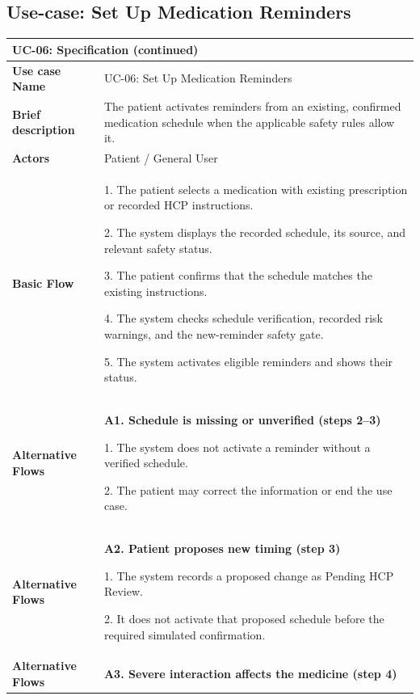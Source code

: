 
\clearpage
\subsection{Use-case: Set Up Medication Reminders}
\label{uc:uc-06}

\begin{longtable}{|p{}|p{}|}
\hline
\endfirsthead
\multicolumn{2}{l}{\textbf{UC-06: Specification (continued)}} \\
\hline
\endhead
\textbf{Use case Name} & UC-06: Set Up Medication Reminders \\ \hline
\textbf{Brief description} & The patient activates reminders from an existing, confirmed medication schedule when the applicable safety rules allow it. \\ \hline
\textbf{Actors} & Patient / General User \\ \hline
\textbf{Basic Flow} &
1. The patient selects a medication with existing prescription or recorded HCP instructions.\par
2. The system displays the recorded schedule, its source, and relevant safety status.\par
3. The patient confirms that the schedule matches the existing instructions.\par
4. The system checks schedule verification, recorded risk warnings, and the new-reminder safety gate.\par
5. The system activates eligible reminders and shows their status.
\\ \hline
\textbf{Alternative Flows} &
\textbf{A1. Schedule is missing or unverified (steps 2--3)}\par
1. The system does not activate a reminder without a verified schedule.\par
2. The patient may correct the information or end the use case.
\\ \hline
\textbf{Alternative Flows} &
\textbf{A2. Patient proposes new timing (step 3)}\par
1. The system records a proposed change as Pending HCP Review.\par
2. It does not activate that proposed schedule before the required simulated confirmation.
\\ \hline
\textbf{Alternative Flows} &
\textbf{A3. Severe interaction affects the medicine (step 4)}\par

\end{longtable}
